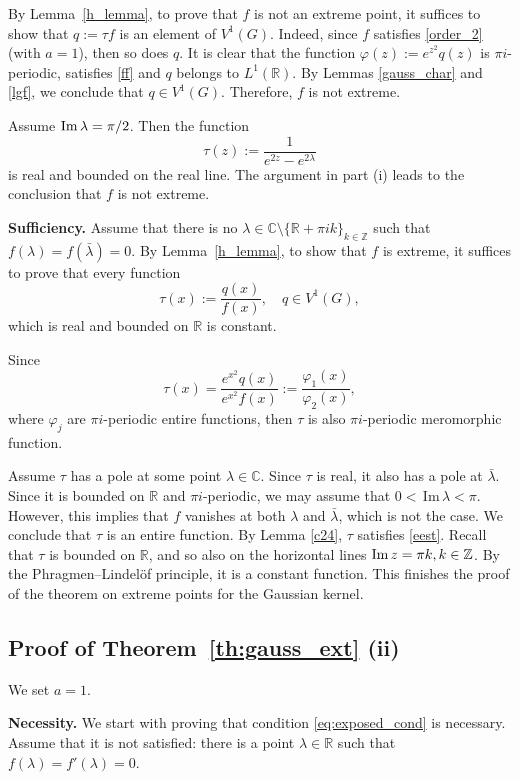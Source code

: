 \documentclass[12pt]{amsart}
\numberwithin{equation}{section}
\theoremstyle{plain}
\theoremstyle{definition}
\newcommand{\R}{{\mathbb R}} \newcommand{\Q}{{\mathbb Q}} \newcommand{\Z}{{\mathbb Z}} \newcommand{\N}{{\mathbb N}}
\newcommand{\Cc}{{\mathbb C}}
\begin{document}
By Lemma~\ref{h_lemma}, to prove that $f$ is not an extreme point, it suffices to show that $q:=\tau f$ is an element of $V^1(G).$
 Indeed,  since $f$ satisfies \eqref{order_2} (with $a=1$), then so does $q$. It is clear that the function $\varphi(z):=e^{z^2}q(z)$ is $\pi i$-periodic, 
satisfies \eqref{ff} and $q$ belongs to $L^1(\R)$. By  Lemmas \ref{gauss_char} and \ref{lgf}, we conclude that  $q\in V^1(G)$. 
Therefore, $f$ is not extreme.

 Assume ${\rm Im \,}\lambda=\pi/2$. Then the function $$\tau(z):=\frac{1}{e^{2z}-e^{2\lambda}}$$ is real and bounded on the real line. The  argument  in part (i) leads to the conclusion that $f$ is not extreme. 

{\bf Sufficiency.}
Assume that there is no $\lambda \in \Cc \setminus\{\R + \pi i k\}_{k \in \Z}$ such that $f(\lambda) = f(\bar \lambda) = 0.$ By Lemma~\ref{h_lemma}, to show that $f$ is extreme, it suffices to prove that every function $$\tau(x) := \frac{q(x)}{f(x)}, \quad q \in V^1(G),$$ which is real and bounded on $\R$ is constant.

Since $$\tau(x)=\frac{e^{x^2} q(x)}{e^{x^2}f(x)}:=\frac{\varphi_1(x)}{\varphi_2(x)},$$where $\varphi_j$  are $\pi i$-periodic entire functions, then $\tau$ is also $\pi i$-periodic meromorphic function.

 Assume  $\tau$ has a pole at some point $\lambda\in\mathbb C$. Since $\tau$ is real, it also has a pole at $\bar\lambda$. Since it is bounded on $\R$ and $\pi i$-periodic, we may assume that  $0<\,$Im$\,\lambda<\pi.$ 
However, this implies 
 that $f$ vanishes at both $\lambda$ and $\bar\lambda$, which is not the case. We conclude that $\tau$ is an entire function. By Lemma \ref{c24}, $\tau$ satisfies 
\eqref{eest}. 
Recall that $\tau$ is  bounded on $\R$, and so also on the horizontal lines ${\rm Im\,} z=\pi k, k\in\Z$. By the Phragmen--Lindel\"{o}f principle, it is a constant function.
This finishes the proof of the theorem on extreme points for the Gaussian kernel.  
   
 


\subsection{Proof of Theorem~\ref{th:gauss_ext}  {\rm (ii)}}\label{34}

We set $a=1.$


{\bf Necessity.}
    We start with proving that condition \eqref{eq:exposed_cond} is necessary. 
    Assume that it  is not satisfied: there is a point $\lambda \in \R$ such that  $f(\lambda)=f'(\lambda)=0$.
\end{document}
